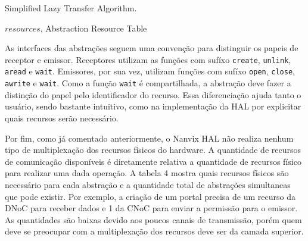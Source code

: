 			\begin{algorithm}
				\caption{Simplified Lazy Transfer Algorithm.}
				\label{euclid}
				\begin{algorithmic}[1]
				\Require $resources$, Abstraction Resource Table


						\Else
						\EndIf
					\EndProcedure%


						\Else
						\EndIf
					\EndProcedure%


					\EndProcedure%

				\end{algorithmic}

			\end{algorithm}

			As interfaces das abstrações seguem uma convenção para distinguir os papeis de receptor e emissor.
			Receptores utilizam as funções com sufíxo \texttt{create}, \texttt{unlink}, \texttt{aread} e \texttt{wait}.
			Emissores, por sua vez, utilizam funções com sufíxo \texttt{open}, \texttt{close}, \texttt{awrite} e \texttt{wait}.
			Como a função \texttt{wait} é compartilhada, a abstração deve fazer a distinção do papel pelo identificador do recurso.
			Essa diferenciação ajuda tanto o usuário, sendo bastante intuitivo, como na implementação da HAL por explicitar quais recursos serão necessário.

			Por fim, como já comentado anteriormente, o Nanvix HAL não realiza nenhum tipo de multiplexação dos recursos físicos do hardware.
			A quantidade de recursos de comunicação disponíveis é diretamente relativa a quantidade de recursos físico para realizar uma dada operação.
			A tabela 4 mostra quais recursos físicos são necessário para cada abstração e a quantidade total de abstrações simultaneas que pode existir.
			Por exemplo, a criação de um portal precisa de um recurso da DNoC para receber dados e 1 da CNoC para enviar a permissão para o emissor.
			As quantidades são baixas devido aos poucos canais de transmissão, porém quem deve se preocupar com a multiplexação dos recursos deve ser da camada superior.

